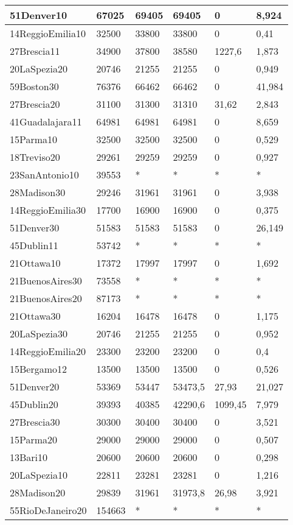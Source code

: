 \begin{longtable}[c]{|l|l|l|l|l|l|}
51Denver10 & 67025 & 69405 & 69405 & 0 & 8,924 \\ \hline
14ReggioEmilia10 & 32500 & 33800 & 33800 & 0 & 0,41 \\ \hline
27Brescia11 & 34900 & 37800 & 38580 & 1227,6 & 1,873 \\ \hline
20LaSpezia20 & 20746 & 21255 & 21255 & 0 & 0,949 \\ \hline
59Boston30 & 76376 & 66462 & 66462 & 0 & 41,984 \\ \hline
27Brescia20 & 31100 & 31300 & 31310 & 31,62 & 2,843 \\ \hline
41Guadalajara11 & 64981 & 64981 & 64981 & 0 & 8,659 \\ \hline
15Parma10 & 32500 & 32500 & 32500 & 0 & 0,529 \\ \hline
18Treviso20 & 29261 & 29259 & 29259 & 0 & 0,927 \\ \hline
23SanAntonio10 & 39553 & * & * & * & * \\ \hline
28Madison30 & 29246 & 31961 & 31961 & 0 & 3,938 \\ \hline
14ReggioEmilia30 & 17700 & 16900 & 16900 & 0 & 0,375 \\ \hline
51Denver30 & 51583 & 51583 & 51583 & 0 & 26,149 \\ \hline
45Dublin11 & 53742 & * & * & * & * \\ \hline
21Ottawa10 & 17372 & 17997 & 17997 & 0 & 1,692 \\ \hline
21BuenosAires30 & 73558 & * & * & * & * \\ \hline
21BuenosAires20 & 87173 & * & * & * & * \\ \hline
21Ottawa30 & 16204 & 16478 & 16478 & 0 & 1,175 \\ \hline
20LaSpezia30 & 20746 & 21255 & 21255 & 0 & 0,952 \\ \hline
14ReggioEmilia20 & 23300 & 23200 & 23200 & 0 & 0,4 \\ \hline
15Bergamo12 & 13500 & 13500 & 13500 & 0 & 0,526 \\ \hline
51Denver20 & 53369 & 53447 & 53473,5 & 27,93 & 21,027 \\ \hline
45Dublin20 & 39393 & 40385 & 42290,6 & 1099,45 & 7,979 \\ \hline
27Brescia30 & 30300 & 30400 & 30400 & 0 & 3,521 \\ \hline
15Parma20 & 29000 & 29000 & 29000 & 0 & 0,507 \\ \hline
13Bari10 & 20600 & 20600 & 20600 & 0 & 0,298 \\ \hline
20LaSpezia10 & 22811 & 23281 & 23281 & 0 & 1,216 \\ \hline
28Madison20 & 29839 & 31961 & 31973,8 & 26,98 & 3,921 \\ \hline
55RioDeJaneiro20 & 154663 & * & * & * & * \\ \hline
\end{longtable}


